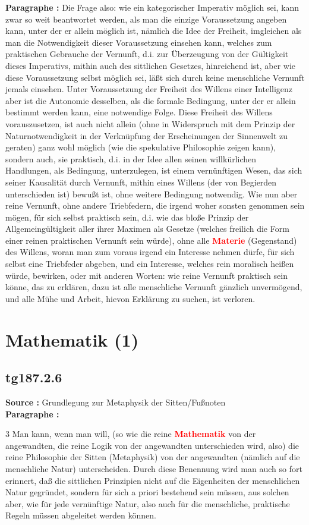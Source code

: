 \documentclass[a4paper,12pt,twoside]{book}
\newcommand{\match}[1]{\textcolor{red}{\textbf{#1}}}
\newcommand{\unnumberedsection}[1]{
	\section*{#1}
	\addcontentsline{toc}{section}{#1}
	\markright{#1}
}
\begin{document}
	\noindent\textbf{Paragraphe : }Die Frage also: wie ein kategorischer Imperativ möglich sei, kann zwar so weit beantwortet werden, als man die einzige Voraussetzung angeben kann, unter der er allein möglich ist, nämlich die Idee der Freiheit, imgleichen als man  die Notwendigkeit dieser Voraussetzung einsehen kann, welches zum praktischen Gebrauche der Vernunft, d.i. zur Überzeugung von der Gültigkeit dieses Imperativs, mithin auch des sittlichen Gesetzes, hinreichend ist, aber wie diese Voraussetzung selbst möglich sei, läßt sich durch keine menschliche Vernunft jemals einsehen. Unter Voraussetzung der Freiheit des Willens einer Intelligenz aber ist die Autonomie desselben, als die formale Bedingung, unter der er allein bestimmt werden kann, eine notwendige Folge. Diese Freiheit des Willens vorauszusetzen, ist auch nicht allein (ohne in Widerspruch mit dem Prinzip der Naturnotwendigkeit in der Verknüpfung der Erscheinungen der Sinnenwelt zu geraten) ganz wohl möglich (wie die spekulative Philosophie zeigen kann), sondern auch, sie praktisch, d.i. in der Idee allen seinen willkürlichen Handlungen, als Bedingung, unterzulegen, ist einem vernünftigen Wesen, das sich seiner Kausalität durch Vernunft, mithin eines Willens (der von Begierden unterschieden ist) bewußt ist, ohne weitere Bedingung notwendig. Wie nun aber reine Vernunft, ohne andere Triebfedern, die irgend woher sonsten genommen sein mögen, für sich selbst praktisch sein, d.i. wie das bloße Prinzip der Allgemeingültigkeit aller ihrer Maximen als Gesetze (welches freilich die Form einer reinen praktischen Vernunft sein würde), ohne alle \match{Materie} (Gegenstand) des Willens, woran man zum voraus irgend ein Interesse nehmen dürfe, für sich selbst eine Triebfeder abgeben, und ein Interesse, welches rein moralisch heißen würde, bewirken, oder mit anderen Worten: wie reine Vernunft praktisch sein könne, das zu erklären, dazu ist alle menschliche Vernunft gänzlich unvermögend, und alle Mühe und Arbeit, hievon Erklärung zu suchen, ist verloren. 
	
	\unnumberedsection{Mathematik (1)} 
	\subsection*{tg187.2.6} 
	\textbf{Source : }Grundlegung zur Metaphysik der Sitten/Fußnoten\\  
	
	\noindent\textbf{Paragraphe : }
	
	3 Man kann, wenn man will, (so wie die reine \match{Mathematik} von der angewandten, die reine Logik von der angewandten unterschieden wird, also) die reine Philosophie der Sitten (Metaphysik) von der angewandten (nämlich auf die menschliche Natur) unterscheiden. Durch diese Benennung wird man auch so fort erinnert, daß die sittlichen Prinzipien nicht auf die Eigenheiten der menschlichen Natur gegründet, sondern für sich a priori bestehend sein müssen, aus solchen aber, wie für jede vernünftige Natur, also auch für die menschliche, praktische Regeln müssen abgeleitet werden können. 
	
\end{document}
